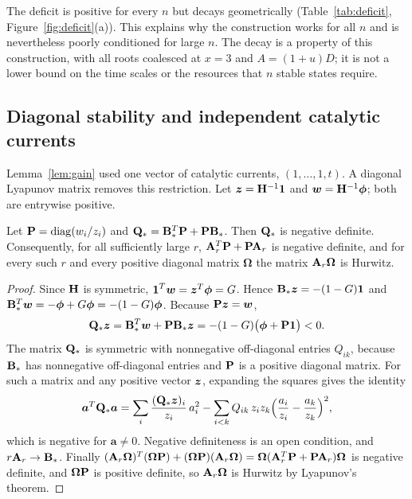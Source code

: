 The deficit is positive for every \(n\) but decays geometrically (Table~\ref{tab:deficit},
Figure~\ref{fig:deficit}(a)). This explains why the construction works for all \(n\) and is
nevertheless poorly conditioned for large \(n\). The decay is a property of this construction,
with all roots coalesced at \(x=3\) and \(A=(1+u)D\); it is not a lower bound on the time
scales or the resources that \(n\) stable states require.

\subsection{Diagonal stability and independent catalytic currents}
Lemma~\ref{lem:gain} used one vector of catalytic currents, \((1,\dots,1,t)\). A diagonal
Lyapunov matrix removes this restriction. Let \(\boldsymbol z=\mathbf H^{-1}\boldsymbol 1\) and \(\boldsymbol w=\mathbf H^{-1}\boldsymbol\phi\);
both are entrywise positive.

\begin{proposition}\label{prop:diagonal}
Let \(\mathbf P=\operatorname{diag}(w_i/z_i)\) and \(\mathbf Q_*=\mathbf B_*^{T}\mathbf P+\mathbf P\mathbf B_*\). Then \(\mathbf Q_*\) is negative
definite. Consequently, for all sufficiently large \(r\), \(\mathbf A_r^{T}\mathbf P+\mathbf P\mathbf A_r\) is negative
definite, and for every such \(r\) and every positive diagonal matrix \(\boldsymbol\Omega\) the
matrix \(\mathbf A_r\boldsymbol\Omega\) is Hurwitz.
\end{proposition}
\begin{proof}
Since \(\mathbf H\) is symmetric, \(\boldsymbol 1^{T}\boldsymbol w=\boldsymbol z^{T}\boldsymbol\phi=G\). Hence \(\mathbf B_*\boldsymbol z=-(1-G)\boldsymbol 1\) and
\(\mathbf B_*^{T}\boldsymbol w=-\boldsymbol\phi+G\boldsymbol\phi=-(1-G)\boldsymbol\phi\). Because \(\mathbf P\boldsymbol z=\boldsymbol w\),
\[
 \mathbf Q_*\boldsymbol z=\mathbf B_*^{T}\boldsymbol w+\mathbf P\mathbf B_*\boldsymbol z=-(1-G)\bigl(\boldsymbol\phi+\mathbf P\boldsymbol 1\bigr)<0 .
\]
The matrix \(\mathbf Q_*\) is symmetric with nonnegative off-diagonal entries \(Q_{ik}\), because
\(\mathbf B_*\) has nonnegative off-diagonal entries and \(\mathbf P\) is a positive diagonal matrix. For
such a matrix and any positive vector \(\boldsymbol z\), expanding the squares gives the identity
\begin{equation}\label{eq:energy}
 \boldsymbol a^{T}\mathbf Q_*\boldsymbol a=\sum_i\frac{(\mathbf Q_*\boldsymbol z)_i}{z_i}\,a_i^2
 -\sum_{i<k}Q_{ik}\,z_iz_k\Bigl(\frac{a_i}{z_i}-\frac{a_k}{z_k}\Bigr)^2 ,
\end{equation}
which is negative for \(\boldsymbol a\ne0\). Negative definiteness is an open condition, and
\(r\mathbf A_r\to\mathbf B_*\). Finally
\((\mathbf A_r\boldsymbol\Omega)^{T}(\boldsymbol\Omega\mathbf P)+(\boldsymbol\Omega\mathbf P)(\mathbf A_r\boldsymbol\Omega)
=\boldsymbol\Omega(\mathbf A_r^{T}\mathbf P+\mathbf P\mathbf A_r)\boldsymbol\Omega\) is negative definite, and
\(\boldsymbol\Omega\mathbf P\) is positive definite, so \(\mathbf A_r\boldsymbol\Omega\) is Hurwitz by
Lyapunov's theorem.
\end{proof}

